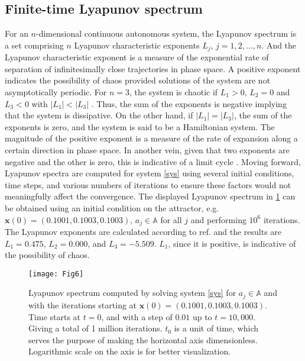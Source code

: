\documentclass[final,5p,times,twocolumn]{elsarticle}
\begin{document}
\subsection{Finite-time Lyapunov spectrum\label{secLyap}}
For an $n$-dimensional continuous autonomous system, the Lyapunov spectrum is a set comprising $n$ Lyapunov characteristic exponents $L_j$, $j=1,2,...,n$. And the Lyapunov characteristic exponent is a measure of the exponential rate of separation of infinitesimally close trajectories in phase space. A positive exponent indicates the possibility of chaos provided solutions of the system are not asymptotically periodic. For $n=3$, the system is chaotic if $L_1>0$, $L_2=0$ and $L_3<0$ with $|L_1|<|L_3|$ \cite{wang2012chaotic}. Thus, the sum of the exponents is negative implying that the system is dissipative. On the other hand, if $|L_1|=|L_3|$, the sum of the exponents is zero, and the system is said to be a Hamiltonian system. The magnitude of the positive exponent is a measure of the rate of expansion along a certain direction in phase space. In another vein, given that two exponents are negative and the other is zero, this is indicative of a limit cycle \cite{muthuswamy2010simplest}. Moving forward, Lyapunov spectra are computed for system \eqref{sys} using several initial conditions, time steps, and various numbers of iterations to ensure these factors would not meaningfully affect the convergence. The displayed Lyapunov spectrum in \cref{lyap} can be obtained using an initial condition on the attractor, e.g.  $\bm{x}(0)=(0.1001, 0.1003, 0.1003)$, $a_j\in\mathbb{A}$ for all $j$ and performing $10^6$ iterations. The Lyapunov exponents are calculated according to ref. \cite{wolf1985determining} and the results are $L_1=0.475$, $L_2 = 0.000$, and $L_3=-5.509$. $L_1$, since it is positive, is indicative of the possibility of chaos. 
\begin{figure}[htbp]
	\texttt{[image: Fig6]}
	\caption{Lyapunov spectrum computed by solving system \eqref{sys} for $a_j\in\mathbb{A}$ and with the iterations starting at $\bm{x}(0)=(0.1001, 0.1003, 0.1003)$. Time starts at $t=0$, and with a step of $0.01$ up to $t=10,000$. Giving a total of 1 million iterations. $t_{0}$ is a unit of time, which serves the purpose of making the horizontal axis dimensionless. Logarithmic scale on the axis is for better visualization.}%
	\label{lyap}
\end{figure}
\end{document}
